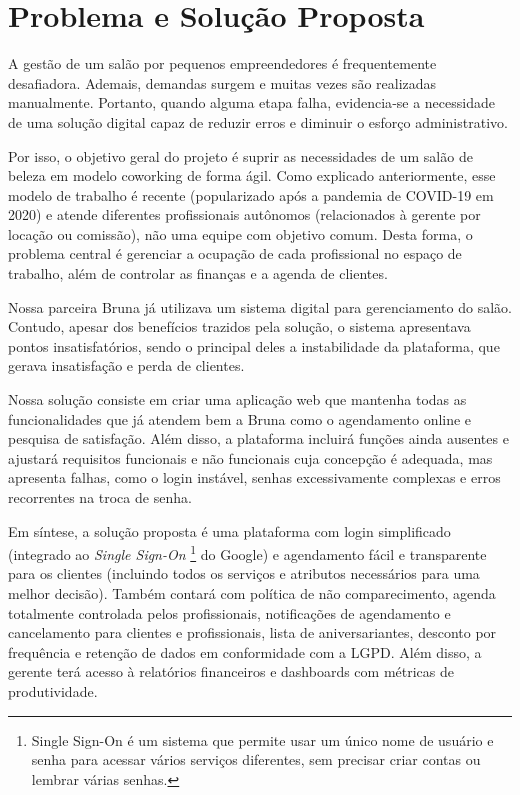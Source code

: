 \section{Problema e Solução Proposta}

A gestão de um salão por pequenos empreendedores é frequentemente desafiadora. Ademais, demandas surgem e muitas vezes são realizadas manualmente. Portanto, quando alguma etapa falha, evidencia‐se a necessidade de uma solução digital capaz de reduzir erros e diminuir o esforço administrativo.

Por isso, o objetivo geral do projeto é suprir as necessidades de um salão de beleza em modelo coworking de forma ágil. Como explicado anteriormente, esse modelo de trabalho é recente (popularizado após a pandemia de COVID-19 em 2020) e atende diferentes profissionais autônomos (relacionados à gerente por locação ou comissão), não uma equipe com objetivo comum. Desta forma, o problema central é gerenciar a ocupação de cada profissional no espaço de trabalho, além de controlar as finanças e a agenda de clientes.

Nossa parceira Bruna já utilizava um sistema digital para gerenciamento do salão. Contudo, apesar dos benefícios trazidos pela solução, o sistema apresentava pontos insatisfatórios, sendo o principal deles a instabilidade da plataforma, que gerava insatisfação e perda de clientes.

Nossa solução consiste em criar uma aplicação web que mantenha todas as funcionalidades que já atendem bem a Bruna como o agendamento online e pesquisa de satisfação. Além disso, a plataforma incluirá funções ainda ausentes e ajustará requisitos funcionais e não funcionais cuja concepção é adequada, mas apresenta falhas, como o login instável, senhas excessivamente complexas e erros recorrentes na troca de senha.

Em síntese, a solução proposta é uma plataforma com login simplificado (integrado ao \emph{Single Sign-On} \footnote{Single Sign-On é um sistema que permite usar um único nome de usuário e senha para acessar vários serviços diferentes, sem precisar criar contas ou lembrar várias senhas.} do Google) e agendamento fácil e transparente para os clientes (incluindo todos os serviços e atributos necessários para uma melhor decisão). Também contará com política de não comparecimento, agenda totalmente controlada pelos profissionais, notificações de agendamento e cancelamento para clientes e profissionais, lista de aniversariantes, desconto por frequência e retenção de dados em conformidade com a LGPD. Além disso, a gerente terá acesso à relatórios financeiros e dashboards com métricas de produtividade.
